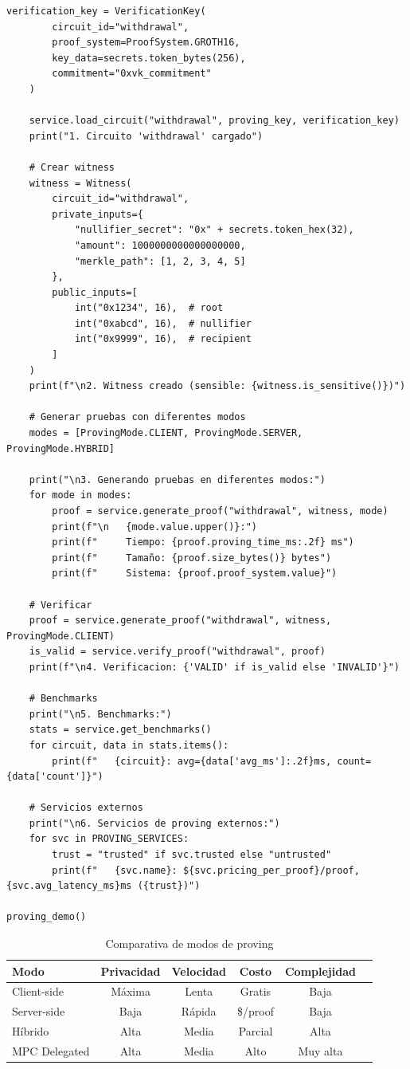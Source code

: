 \documentclass[11pt,a4paper,twoside]{book}
\theoremstyle{definition}
\theoremstyle{remark}
\begin{document}
\begin{lstlisting}[style=python, caption={Infraestructura de proving ZK}]
    verification_key = VerificationKey(
        circuit_id="withdrawal",
        proof_system=ProofSystem.GROTH16,
        key_data=secrets.token_bytes(256),
        commitment="0xvk_commitment"
    )
    
    service.load_circuit("withdrawal", proving_key, verification_key)
    print("1. Circuito 'withdrawal' cargado")
    
    # Crear witness
    witness = Witness(
        circuit_id="withdrawal",
        private_inputs={
            "nullifier_secret": "0x" + secrets.token_hex(32),
            "amount": 1000000000000000000,
            "merkle_path": [1, 2, 3, 4, 5]
        },
        public_inputs=[
            int("0x1234", 16),  # root
            int("0xabcd", 16),  # nullifier
            int("0x9999", 16),  # recipient
        ]
    )
    print(f"\n2. Witness creado (sensible: {witness.is_sensitive()})")
    
    # Generar pruebas con diferentes modos
    modes = [ProvingMode.CLIENT, ProvingMode.SERVER, ProvingMode.HYBRID]
    
    print("\n3. Generando pruebas en diferentes modos:")
    for mode in modes:
        proof = service.generate_proof("withdrawal", witness, mode)
        print(f"\n   {mode.value.upper()}:")
        print(f"     Tiempo: {proof.proving_time_ms:.2f} ms")
        print(f"     Tamaño: {proof.size_bytes()} bytes")
        print(f"     Sistema: {proof.proof_system.value}")
    
    # Verificar
    proof = service.generate_proof("withdrawal", witness, ProvingMode.CLIENT)
    is_valid = service.verify_proof("withdrawal", proof)
    print(f"\n4. Verificacion: {'VALID' if is_valid else 'INVALID'}")
    
    # Benchmarks
    print("\n5. Benchmarks:")
    stats = service.get_benchmarks()
    for circuit, data in stats.items():
        print(f"   {circuit}: avg={data['avg_ms']:.2f}ms, count={data['count']}")
    
    # Servicios externos
    print("\n6. Servicios de proving externos:")
    for svc in PROVING_SERVICES:
        trust = "trusted" if svc.trusted else "untrusted"
        print(f"   {svc.name}: ${svc.pricing_per_proof}/proof, {svc.avg_latency_ms}ms ({trust})")

proving_demo()
\end{lstlisting}

\begin{table}[htbp]
\centering
\small
\begin{tabular}{lccccc}
\toprule
\textbf{Modo} & \textbf{Privacidad} & \textbf{Velocidad} & \textbf{Costo} & \textbf{Complejidad} \\
\midrule
Client-side & Máxima & Lenta & Gratis & Baja \\
Server-side & Baja & Rápida & \$/proof & Baja \\
Híbrido & Alta & Media & Parcial & Alta \\
MPC Delegated & Alta & Media & Alto & Muy alta \\
\bottomrule
\end{tabular}
\caption{Comparativa de modos de proving}
\end{table}
\end{document}
